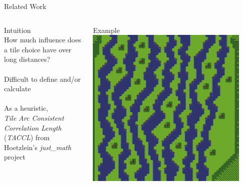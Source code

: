 \documentclass{beamer}
\begin{document}

  \begin{frame}[fragile]{Related Work}
    \begin{columns}[T,onlytextwidth]
        \begin{block}{Intuition}
          \hfill \\
          How much influence does a tile choice have over long distances? \\
          \hfill \\
          Difficult to define and/or calculate \\
          \hfill \\
          As a heuristic, \\
          \textit{Tile Arc Consistent Correlation Length} (\textit{TACCL}) 
            from Hoetzlein's \textit{just\_math} project
        \end{block}
        \begin{block}{Example}
          \includegraphics[width=0.9\textwidth]{img/forestmicro_64x64.pdf}
        \end{block}
    \end{columns}
  \end{frame}

\end{document}
